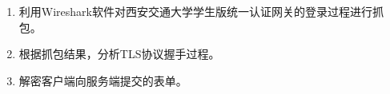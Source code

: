 \begin{enumerate}
	\item 利用Wireshark软件对西安交通大学学生版统一认证网关的登录过程进行抓包。
	\item 根据抓包结果，分析TLS协议握手过程。
	\item 解密客户端向服务端提交的表单。
\end{enumerate}